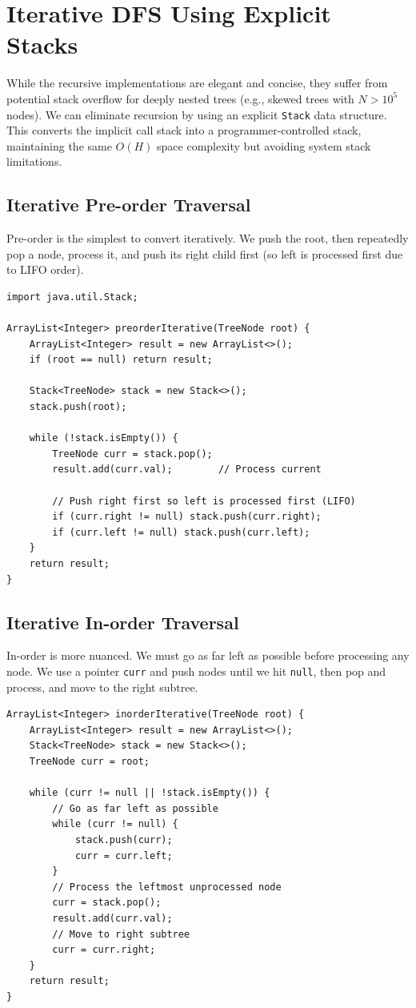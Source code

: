 \documentclass[10pt,journal,compsoc,onecolumn]{IEEEtran}
\begin{document}
\section{Iterative DFS Using Explicit Stacks}
\label{sec:iterative}

While the recursive implementations are elegant and concise, they suffer from potential stack overflow for deeply nested trees (e.g., skewed trees with $N > 10^5$ nodes). We can eliminate recursion by using an explicit \texttt{Stack} data structure. This converts the implicit call stack into a programmer-controlled stack, maintaining the same $O(H)$ space complexity but avoiding system stack limitations.

\subsection{Iterative Pre-order Traversal}

Pre-order is the simplest to convert iteratively. We push the root, then repeatedly pop a node, process it, and push its right child first (so left is processed first due to LIFO order).

\begin{verbatim}
import java.util.Stack;

ArrayList<Integer> preorderIterative(TreeNode root) {
    ArrayList<Integer> result = new ArrayList<>();
    if (root == null) return result;

    Stack<TreeNode> stack = new Stack<>();
    stack.push(root);

    while (!stack.isEmpty()) {
        TreeNode curr = stack.pop();
        result.add(curr.val);        // Process current

        // Push right first so left is processed first (LIFO)
        if (curr.right != null) stack.push(curr.right);
        if (curr.left != null) stack.push(curr.left);
    }
    return result;
}
\end{verbatim}

\subsection{Iterative In-order Traversal}

In-order is more nuanced. We must go as far left as possible before processing any node. We use a pointer \texttt{curr} and push nodes until we hit \texttt{null}, then pop and process, and move to the right subtree.

\begin{verbatim}
ArrayList<Integer> inorderIterative(TreeNode root) {
    ArrayList<Integer> result = new ArrayList<>();
    Stack<TreeNode> stack = new Stack<>();
    TreeNode curr = root;

    while (curr != null || !stack.isEmpty()) {
        // Go as far left as possible
        while (curr != null) {
            stack.push(curr);
            curr = curr.left;
        }
        // Process the leftmost unprocessed node
        curr = stack.pop();
        result.add(curr.val);
        // Move to right subtree
        curr = curr.right;
    }
    return result;
}
\end{verbatim}
\end{document}

